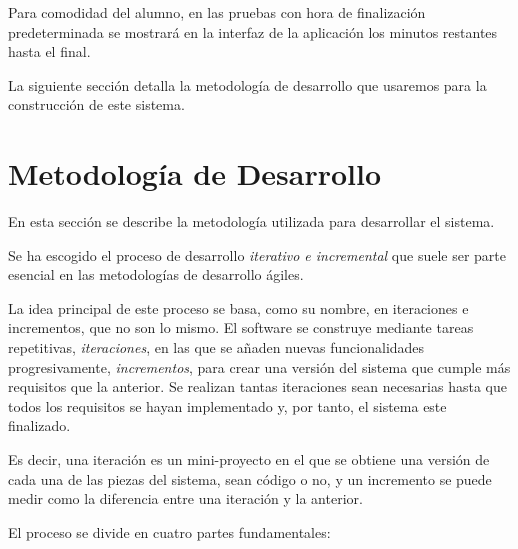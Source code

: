 Para comodidad del alumno, en las pruebas con hora de finalización predeterminada se mostrará en la interfaz de la aplicación los minutos restantes hasta el final.



La siguiente sección detalla la metodología de desarrollo que usaremos para la construcción de este sistema.

\section{Metodología de Desarrollo}
\label{sec:planificacion:metodologia}


En esta sección se describe la metodología utilizada para desarrollar el sistema.
\newline

Se ha escogido el proceso de desarrollo \emph{iterativo e incremental} que suele ser parte esencial en las metodologías de desarrollo ágiles.
\newline

La idea principal de este proceso se basa, como su nombre, en iteraciones e incrementos, que no son lo mismo.
El software se construye mediante tareas repetitivas, \emph{iteraciones}, en las que se añaden nuevas funcionalidades progresivamente, \emph{incrementos}, para crear una versión del sistema que cumple más requisitos que la anterior. Se realizan tantas iteraciones sean necesarias hasta que todos los requisitos se hayan implementado y, por tanto, el sistema este finalizado.

Es decir, una iteración es un mini-proyecto en el que se obtiene una versión de cada una de las piezas del sistema, sean código o no, y un incremento se puede medir como la diferencia entre una iteración y la anterior.
\newline

El proceso se divide en cuatro partes fundamentales:

